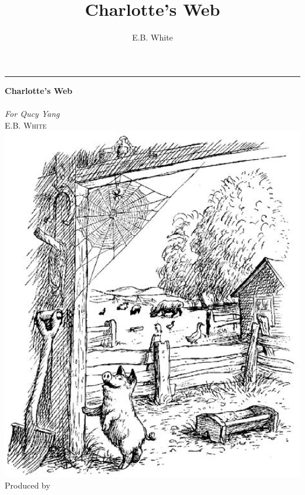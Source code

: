 \documentclass[a4paper, oneside]{book}
\author{E.B. White}
\title{Charlotte's Web}
\newcommand*{\plogo}{\fbox{$\mathcal{PL}$}} %
\begin{document}
  \begin{titlepage}
      	\raggedleft %
	
	\rule{1pt}{\textheight} %
	\hspace{0.05\textwidth} %
	\parbox[b]{0.85\textwidth}{ %
		
		{\Huge\bfseries Charlotte's Web\\[0.5\baselineskip]}\\[2\baselineskip] %
		{\large\textit{For Qucy Yang}}\\[4\baselineskip] %
		{\Large\textsc{E.B. White}} %
		\vspace{0.2\textheight} %
		\vfill
    \includegraphics[scale=0.5]{cover.eps} %
    \vfill
		{\noindent Produced by \LaTeXe{}~~\plogo}\\[\baselineskip] %
	}

  \end{titlepage}
\end{document}
